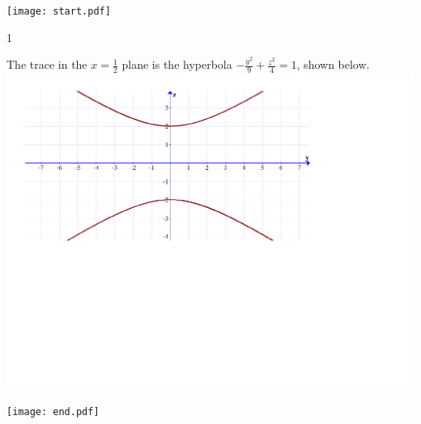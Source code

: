 \documentclass[12pt]{article}
\begin{document}
\begin{enumerate}
\texttt{[image: start.pdf]}
{{{1\linewidth}{\begin{center}The trace in the $x=\frac{1}{2}$ plane is the hyperbola $-\frac{y^2}{9}+\frac{z^2}{4}=1$, shown below.\\
\includegraphics[scale=0.4]{traces3.pdf}
\end{center}}}}
\texttt{[image: end.pdf]}


\end{enumerate}

\end{document}
